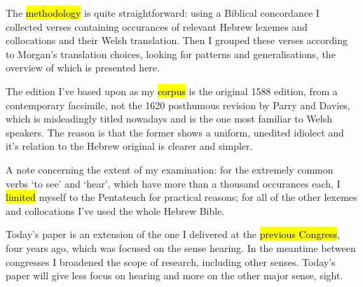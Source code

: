 \begin{paper}
	{\click} The \hl{methodology} is quite straightforward:  using a Biblical concordance I collected verses containing occurances of relevant Hebrew lexemes and collocations and their Welsh translation.  Then I grouped these verses according to Morgan’s translation choices,  looking for patterns and generalisations, the overview of which is presented here.

	\begin{leftbar}
		{\click} The edition I’ve based upon as my \hl{corpus} is the original 1588 edition, from a contemporary facsimile, not the 1620 posthumous revision by Parry and Davies, which is misleadingly titled  nowadays and is the one most familiar to Welsh speakers. The reason is that the former shows a uniform, unedited idiolect and it’s relation to the Hebrew original is clearer and simpler.
	\end{leftbar}

	\begin{leftbar}
		{\click} A note concerning the extent of my examination: for the extremely common verbs  ‘to see’ and  ‘hear’, which have more than a thousand occurances each, I \hl{limited} myself to the Pentateuch for practical reasons; for all of the other lexemes and collocations I’ve used the whole Hebrew Bible.
	\end{leftbar}

	{\click} Today’s paper is an extension of the one I delivered at the \hl{previous Congress}, four years ago, which was focused on the sense hearing. In the meantime between congresses I broadened the scope of research, including other senses. Today’s paper will give less focus on hearing and more on the other major sense, sight.
\end{paper}

